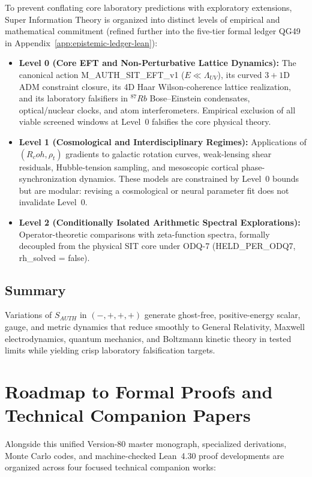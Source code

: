 \documentclass[american,11pt,letterpaper]{article}
\newcommand{\Rcoh}{R_{\mathrm{coh}}}
\def\mathrm#1{#1}%
\def\texttt#1{#1}%
\def\Rcoh{R_coh}%
\begin{document}
To prevent conflating core laboratory predictions with exploratory extensions, Super Information Theory is organized into distinct levels of empirical and mathematical commitment (refined further into the five-tier formal ledger \texttt{QG49} in Appendix~\ref{app:epistemic-ledger-lean}):
\begin{itemize}
  \item \textbf{Level 0 (Core EFT and Non-Perturbative Lattice Dynamics):} The canonical action \texttt{M\_AUTH\_SIT\_EFT\_v1} ($E \ll \Lambda_{\mathrm{UV}}$), its curved $3+1$D ADM constraint closure, its 4D Haar Wilson-coherence lattice realization, and its laboratory falsifiers in $^{87}\mathrm{Rb}$ Bose--Einstein condensates, optical/nuclear clocks, and atom interferometers. Empirical exclusion of all viable screened windows at Level~0 falsifies the core physical theory.
  \item \textbf{Level 1 (Cosmological and Interdisciplinary Regimes):} Applications of $(\Rcoh, \rho_t)$ gradients to galactic rotation curves, weak-lensing shear residuals, Hubble-tension sampling, and mesoscopic cortical phase-synchronization dynamics. These models are constrained by Level~0 bounds but are modular: revising a cosmological or neural parameter fit does not invalidate Level~0.
  \item \textbf{Level 2 (Conditionally Isolated Arithmetic Spectral Explorations):} Operator-theoretic comparisons with zeta-function spectra, formally decoupled from the physical SIT core under \texttt{ODQ-7} (\texttt{HELD\_PER\_ODQ7}, \texttt{rh\_solved = false}).
\end{itemize}

\subsection{Summary}

Variations of $S_{\mathrm{AUTH}}$ in $(-,+,+,+)$ generate ghost-free, positive-energy scalar, gauge, and metric dynamics that reduce smoothly to General Relativity, Maxwell electrodynamics, quantum mechanics, and Boltzmann kinetic theory in tested limits while yielding crisp laboratory falsification targets.

\section{Roadmap to Formal Proofs and Technical Companion Papers}
\label{app:roadmap}

Alongside this unified Version-80 master monograph, specialized derivations, Monte Carlo codes, and machine-checked Lean~4.30 proof developments are organized across four focused technical companion works:
\end{document}
